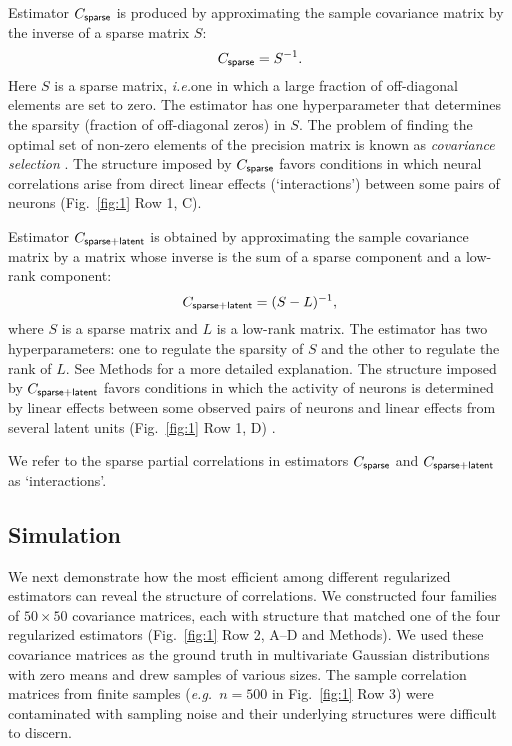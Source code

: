 {Estimator $C_{\sf sparse}$ is produced by approximating the sample covariance matrix by the inverse of a sparse matrix $S$:
\begin{equation}\label{eq:c-sparse}
C_{\sf sparse} = S^{-1}.
\end{equation}
Here $S$ is a sparse matrix, \emph{i.e.}\;one in which a large fraction of off-diagonal elements are set to zero.  The estimator has one hyperparameter that determines the sparsity (fraction of off-diagonal zeros) in $S$. The problem of finding the optimal set of non-zero elements of the precision matrix is known as \emph{covariance selection} \cite{Dempster:1972}. The structure imposed by $C_{\sf sparse}$ favors conditions in which neural correlations arise from direct linear effects (`interactions') between some pairs of neurons (Fig.~\ref{fig:1}} Row 1, C).

Estimator $C_{\sf sparse+latent}$ is obtained by approximating the sample covariance matrix by a matrix whose inverse is the sum of a sparse component and a low-rank component:
\begin{equation}\label{eq:c-sl}
C_{\sf sparse+latent} = (S - L)^{-1},
\end{equation}
where $S$ is a sparse matrix and $L$ is a low-rank matrix. The estimator has two hyperparameters: one to regulate the sparsity of $S$ and the other to regulate the rank of $L$. See Methods for a more detailed explanation. The structure imposed by $C_{\sf sparse+latent}$ favors conditions in which the activity of neurons is determined by linear effects between some observed pairs of neurons and linear effects from several latent units (Fig.~\ref{fig:1} Row 1, D) \cite{Chandrasekaran:2010,Ma:2013}.

We refer to the sparse partial correlations in estimators $C_{\sf sparse}$ and $C_{\sf sparse+latent}$ as `interactions'.

\subsection*{Simulation}
We next demonstrate how the most efficient among different regularized estimators can reveal the structure of correlations.
We constructed four families of $50\times 50$ covariance matrices, each with structure that matched one of the four regularized estimators (Fig.~\ref{fig:1} Row 2, A--D and Methods).  We used these covariance matrices as the ground truth in multivariate Gaussian distributions with zero means and drew samples of various sizes. 
The sample correlation matrices from finite samples (\emph{e.g.}\ $n=500$ in Fig.~\ref{fig:1} Row 3) were contaminated with sampling noise and their underlying structures were difficult to discern.

